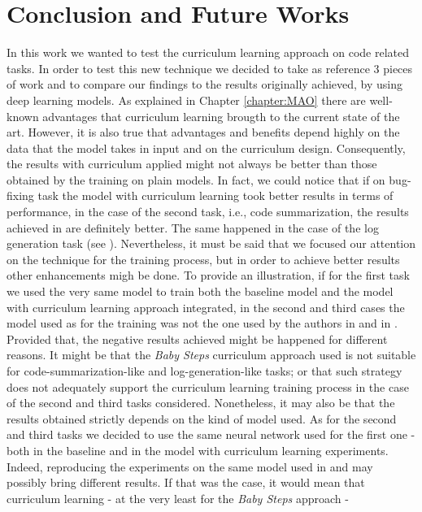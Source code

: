 \chapter{Conclusion and Future Works}
In this work we wanted to test the curriculum learning approach on code related tasks.
In order to test this new technique we decided to take as reference 3 pieces of work and to compare 
our findings to the results originally achieved, by using deep learning models.
As explained in Chapter \ref{chapter:MAO} there are well-known advantages that curriculum learning
brougth to the current state of the art. However, it is also true that advantages and benefits depend highly on the data 
that the model takes in input and on the curriculum design. Consequently, the results with curriculum applied might not always be better than 
those obtained by the training on plain models. 
In fact, we could notice that if on bug-fixing task the model with curriculum learning 
took better results in terms of performance, 
in the case of the second task, i.e., code summarization, the results achieved in \cite{Leclair2020}
are definitely better. The same happened in the case of the log generation task (see \cite{Mastropaolo2022}).
Nevertheless, it must be said that we focused our attention on the technique for the training process, but in order to achieve better 
results other enhancements migh be done. To provide an illustration, if for the first task we used the very same model 
to train both the baseline model and the model with curriculum learning approach integrated, in the second and third cases the model used as for the training was not the 
one used by the authors in \cite{Leclair2020} and in \cite{Mastropaolo2022}. \\
Provided that, the negative results achieved might be happened for different reasons.
It might be that 
the \textit{Baby Steps} curriculum approach used is not suitable for code-summarization-like and log-generation-like tasks;
or that such strategy does not adequately support the curriculum learning training process in the case of the second and third tasks considered.
Nonetheless, it may also be that the results obtained 
strictly depends on the kind of model used. As for the second and third tasks we decided to use the same neural network used 
for the first one - both in the baseline and in the model with curriculum learning experiments.
Indeed, 
reproducing the experiments on the same model used in \cite{Leclair2020} and \cite{Mastropaolo2022} may possibly bring different results.
If that was the case, it would mean that curriculum learning - at the very least for the \textit{Baby Steps} approach - 
